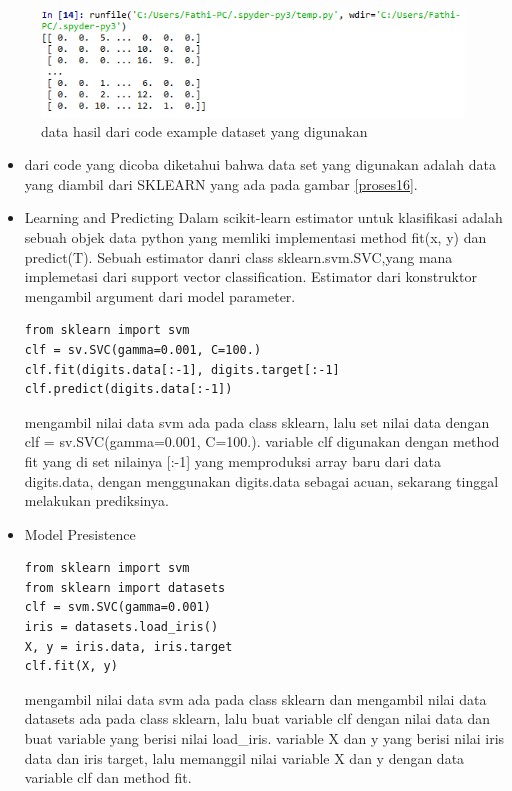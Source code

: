 \begin{enumerate}
\begin{figure}
\centerline{\includegraphics[width=1\textwidth]{figures/fathi/15.PNG}}
\caption{data hasil dari code example dataset yang digunakan}
\label{proses15}
\end{figure}
\begin{itemize}
\item
dari code yang dicoba diketahui bahwa data set yang digunakan adalah data yang diambil dari SKLEARN yang ada pada gambar \ref{proses16}.
\end{itemize}
\begin{itemize}
\item
Learning and Predicting
\subitem
Dalam scikit-learn estimator untuk klasifikasi adalah sebuah objek data python yang memliki implementasi method fit(x, y) dan predict(T). Sebuah estimator danri class sklearn.svm.SVC,yang mana implemetasi dari support vector classification. Estimator dari konstruktor mengambil argument dari model parameter.
\begin{verbatim}
from sklearn import svm
clf = sv.SVC(gamma=0.001, C=100.)
clf.fit(digits.data[:-1], digits.target[:-1]
clf.predict(digits.data[:-1])
\end{verbatim}
\subitem
mengambil nilai data svm ada pada class sklearn, lalu set nilai data dengan clf = sv.SVC(gamma=0.001, C=100.). variable clf digunakan dengan method fit yang di set nilainya [:-1] yang memproduksi array baru dari data digits.data, dengan menggunakan digits.data sebagai acuan, sekarang tinggal melakukan prediksinya.

\item
Model Presistence

\begin{verbatim}
from sklearn import svm
from sklearn import datasets
clf = svm.SVC(gamma=0.001)
iris = datasets.load_iris()
X, y = iris.data, iris.target
clf.fit(X, y)
\end{verbatim}
\subitem
mengambil nilai data svm ada pada class sklearn dan mengambil nilai data datasets ada pada class sklearn, lalu buat variable clf dengan nilai data  dan buat variable yang berisi nilai load\_iris. variable X dan y yang berisi nilai iris data dan iris target, lalu memanggil nilai variable X dan y dengan data variable clf dan method fit.


\end{itemize}
\end{enumerate}
